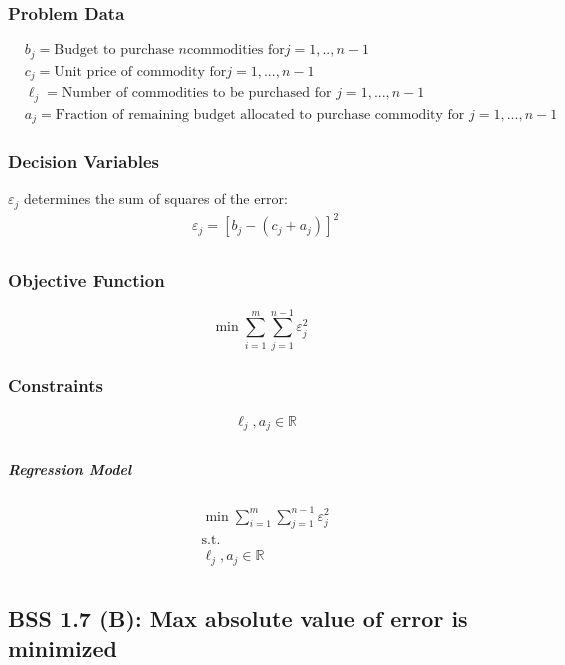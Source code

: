 \documentclass[12pt]{article}
\begin{document}
\subsubsection{Problem Data}
\begin{equation*}
    \begin{split}
        &b_j= \text{Budget to purchase }n \text{commodities for} j=1,..,n-1\\
        &c_j=\text{Unit price of commodity for} j=1,...,n-1\\
        &\ell_j= \text{Number of commodities to be purchased for } j=1,...,n-1\\
        &a_j= \text{Fraction of remaining budget allocated to purchase commodity for } j=1,...,n-1
    \end{split}
\end{equation*}
\subsubsection{Decision Variables}
\( \varepsilon_j \) determines the sum of squares of the error:
    \begin{align*}    
        &\varepsilon_j = [b_j-(c_j + a_j)]^2\\
    \end{align*}

\subsubsection{Objective Function}
\begin{equation*}
    \min \sum_{i=1}^{m} \sum_{j=1}^{n-1} \varepsilon_j^2
\end{equation*}

\subsubsection{Constraints}
    \begin{align*}
        &\ell_j, a_j \in \mathbb{R}\\
    \end{align*}
\subparagraph{Regression Model}
    \begin{align*}
        &\min \sum_{i=1}^{m} \sum_{j=1}^{n-1} \varepsilon_j^2\\
        &\text{s.t.}\\
        &\ell_j, a_j \in \mathbb{R} \\
    \end{align*}
    
\subsection{BSS 1.7 (B): Max absolute value of error is minimized}
\end{document}
